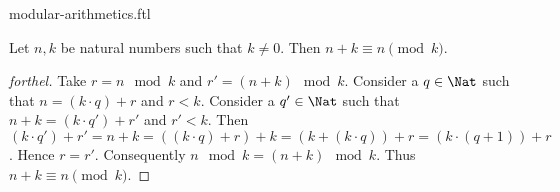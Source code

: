 \documentclass{naproche-library}
\begin{document}
\begin{smodule}{modular-arithmetics.ftl}
  \begin{proposition}[forthel,id=ARITHMETIC_08_5984712287846400]
    Let $n, k$ be natural numbers such that $k \neq 0$.
    Then $n + k \equiv n \pmod{k}$.
  \end{proposition}
  \begin{proof}[forthel]
    Take $r = n \mod k$ and $r' = (n + k) \mod k$.
    Consider a $q \in \Nat$ such that $n = (k \cdot q) + r$ and $r < k$.
    Consider a $q' \in \Nat$ such that $n + k = (k \cdot q') + r'$ and
    $r' < k$.
    Then $(k \cdot q') + r'
      = n + k
      = ((k \cdot q) + r) + k
      = (k + (k \cdot q)) + r
      = (k \cdot (q + 1)) + r$.
    Hence $r = r'$.
    Consequently $n \mod k = (n + k) \mod k$.
    Thus $n + k \equiv n \pmod{k}$.
  \end{proof}
\end{smodule}
\end{document}
